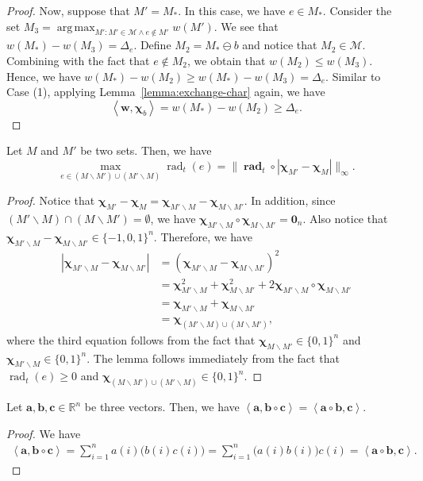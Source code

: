 \documentclass{article}
\newcommand{\M}{\mathcal M}
\newcommand{\del}{\backslash}
\newcommand{\RR}{\mathbb R}
\DeclareMathOperator{\rad}{rad}
\DeclareMathOperator*{\argmax}{arg\,max}
\newcommand{\inn}[1]{\left\langle #1 \right\rangle}
\renewcommand{\vec}[1]{\boldsymbol{#1}}
\renewcommand{\odot}{\circ}
\begin{document}
\begin{proof}
Now, suppose that $M'=M_*$. 
In this case, we have $e\in M_*$.
Consider the set $M_3 = \argmax_{M': M'\in \M \wedge e\not \in M'} w(M')$.
We see that $w(M_*)-w(M_3)=\Delta_e$.
Define $M_2 = M_* \ominus b$ and notice that  $M_2 \in \M$.
Combining with the fact that $e\not \in M_2$, we obtain that $w(M_2) \le w(M_3)$.
Hence, we have
$w(M_*)-w(M_2) \ge w(M_*)-w(M_3)=\Delta_e$.
Similar to Case (1), applying Lemma~\ref{lemma:exchange-char} again, we have
$$
\inn{\vec w,\vec \chi_b} = w(M_*)-w(M_2) \ge \Delta_e.
$$


\end{proof}

\begin{lemma}
\label{lemma:max}
Let $M$ and $M'$ be two sets. 
Then, we have 
$$ \max_{e \in (M\del M') \cup (M'\del M)} \rad_t(e) = \big\|\vec \rad_t \odot |\vec \chi_{M'} - \vec \chi_M| \big\|_\infty.$$
\end{lemma}

\begin{proof}
Notice that $\vec\chi_{M'}-\vec\chi_{M} = \vec\chi_{M'\del M}-\vec\chi_{M\del M'}$.
In addition, since $(M'\del M) \cap (M\del M') = \emptyset$, we have
$\vec \chi_{M'\del M} \odot \vec\chi_{M\del M'} = \vec 0_n$. 
Also notice that $ \vec\chi_{M'\del M}-\vec\chi_{M\del M'} \in \{-1,0,1\}^n$.
Therefore, we have
\begin{align*}
|\vec\chi_{M'\del M}-\vec\chi_{M\del M'}| 
&= (\vec\chi_{M'\del M}-\vec\chi_{M\del M'})^2\\
&=\vec\chi_{M'\del M}^2+\vec\chi_{M\del M'}^2+2\vec \chi_{M'\del M} \odot \vec\chi_{M\del M'} \\
&=\vec\chi_{M'\del M}+\vec\chi_{M\del M'}\\
& = \vec\chi_{(M' \del M) \cup (M\del M')},
\end{align*}
where the third equation follows from the fact that $\vec\chi_{M\del M'}\in \{0,1\}^n$ and $\vec\chi_{M'\del M}\in\{0,1\}^n$.
The lemma follows immediately from the fact that $\rad_t(e) \ge 0$ and  $\vec\chi_{(M\del M')\cup(M'\del M)}\in \{0,1\}^n$.
\end{proof}

\begin{lemma}
\label{lemma:vector-technical}
Let $\vec a,\vec b, \vec c \in \RR^n$ be three vectors.
Then, we have $\inn{\vec a, \vec b\odot \vec c} = \inn{\vec a\odot \vec b,\vec c}$.
\end{lemma}

\begin{proof}
We have
\begin{align*}
	\inn{\vec a,\vec b\odot \vec c} = \sum_{i=1}^n a(i) \big(b(i) c(i)\big) = \sum_{i=1}^n \big(a(i)b(i)\big)c(i) = \inn{\vec a\odot\vec b,\vec c}.
\end{align*}
\end{proof}
\end{document}
